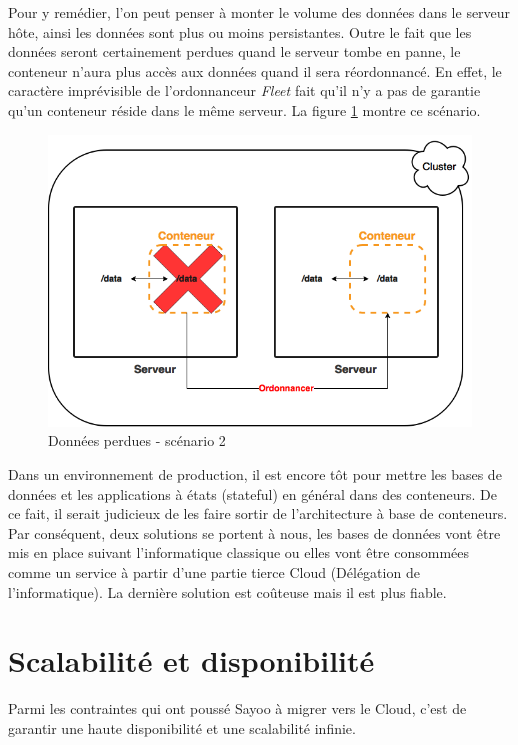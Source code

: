 \begin{onehalfspace}
Pour y remédier, l'on peut penser à monter le volume des données dans le serveur hôte, ainsi les données sont plus ou moins persistantes. Outre le fait que les données seront certainement perdues quand le serveur tombe en panne, le conteneur n'aura plus accès aux données quand il sera réordonnancé. En effet, le caractère imprévisible de l'ordonnanceur \emph{Fleet} fait qu'il n'y a pas de garantie qu'un conteneur réside dans le même serveur. La figure \ref{fig:database2} montre ce scénario.

\begin{figure}[H]
\centering
\includegraphics [scale=0.5]{chapitre4/assets/database2}
\caption{Données perdues - scénario 2}
\label{fig:database2}
\end{figure}


Dans un environnement de production, il est encore tôt pour mettre les bases de données et les applications à états (stateful) en général dans des conteneurs. De ce fait, il serait judicieux de les faire sortir de l'architecture à base de conteneurs. Par conséquent, deux solutions se portent à nous, les bases de données vont être mis en place suivant l'informatique classique ou elles vont être consommées comme un service à partir d'une partie tierce Cloud (Délégation de l'informatique). La dernière solution est coûteuse mais il est plus fiable.



\section{Scalabilité et disponibilité}


Parmi les contraintes qui ont poussé Sayoo à migrer vers le Cloud, c'est de garantir une haute disponibilité et une scalabilité infinie.


\end{onehalfspace}
